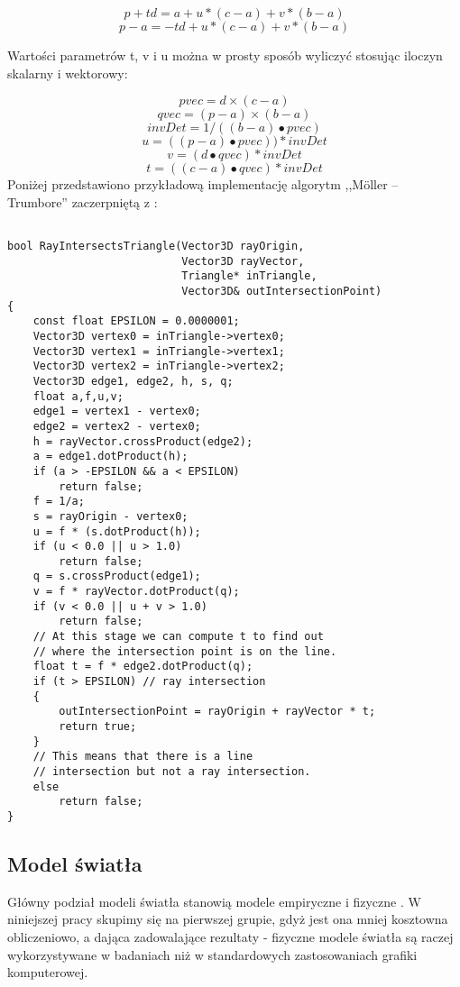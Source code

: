$$p + td = a + u * (c - a) + v * (b - a)$$
$$p - a = -td + u * (c - a) + v * (b - a)$$

Wartości parametrów t, v i u można w prosty sposób wyliczyć stosując iloczyn skalarny i wektorowy:

$$pvec = d \times (c - a)$$
$$qvec = (p - a) \times (b - a)$$
$$invDet = 1/((b - a) \bullet pvec)$$
$$u = ((p - a) \bullet pvec)) * invDet$$
$$v = (d \bullet qvec) * invDet$$
$$t = ((c - a) \bullet qvec) * invDet$$
Poniżej przedstawiono przykładową implementację algorytm ,,Möller – Trumbore'' zaczerpniętą z \cite{wikiMoll}:

\begin{lstlisting}

bool RayIntersectsTriangle(Vector3D rayOrigin, 
                           Vector3D rayVector, 
                           Triangle* inTriangle,
                           Vector3D& outIntersectionPoint)
{
    const float EPSILON = 0.0000001; 
    Vector3D vertex0 = inTriangle->vertex0;
    Vector3D vertex1 = inTriangle->vertex1;  
    Vector3D vertex2 = inTriangle->vertex2;
    Vector3D edge1, edge2, h, s, q;
    float a,f,u,v;
    edge1 = vertex1 - vertex0;
    edge2 = vertex2 - vertex0;
    h = rayVector.crossProduct(edge2);
    a = edge1.dotProduct(h);
    if (a > -EPSILON && a < EPSILON)
        return false;
    f = 1/a;
    s = rayOrigin - vertex0;
    u = f * (s.dotProduct(h));
    if (u < 0.0 || u > 1.0)
        return false;
    q = s.crossProduct(edge1);
    v = f * rayVector.dotProduct(q);
    if (v < 0.0 || u + v > 1.0)
        return false;
    // At this stage we can compute t to find out
    // where the intersection point is on the line.
    float t = f * edge2.dotProduct(q);
    if (t > EPSILON) // ray intersection
    {
        outIntersectionPoint = rayOrigin + rayVector * t; 
        return true;
    }
    // This means that there is a line
    // intersection but not a ray intersection.
    else 
        return false;
}

\end{lstlisting}



\subsection{Model światła}

Główny podział modeli światła stanowią modele empiryczne i fizyczne \cite{suffern2007, falski2004}. W niniejszej pracy skupimy się na pierwszej grupie, gdyż jest ona mniej kosztowna obliczeniowo, a dająca zadowalające rezultaty - fizyczne modele światła są raczej wykorzystywane w badaniach niż w standardowych zastosowaniach grafiki komputerowej.


